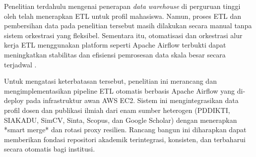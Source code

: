 \documentclass{rapidsart}
\theoremstyle{plain}
\theoremstyle{remark}
\theoremstyle{definition}
\begin{document}
\begin{sloppypar}
    Penelitian terdahulu mengenai penerapan \textit{data warehouse} di perguruan tinggi oleh \cite{oslan2018proses} telah menerapkan ETL untuk profil mahasiswa. Namun, proses ETL dan pembersihan data pada penelitian tersebut masih dilakukan secara manual tanpa sistem orkestrasi yang fleksibel. Sementara itu, otomatisasi dan orkestrasi alur kerja ETL menggunakan platform seperti Apache Airflow terbukti dapat meningkatkan stabilitas dan efisiensi pemrosesan data skala besar secara terjadwal \citep{koppula2020etl}.

    Untuk mengatasi keterbatasan tersebut, penelitian ini merancang dan mengimplementasikan pipeline ETL otomatis berbasis Apache Airflow yang di-deploy pada infrastruktur awan AWS EC2. Sistem ini mengintegrasikan data profil dosen dan publikasi ilmiah dari enam sumber heterogen (PDDIKTI, SIAKADU, SimCV, Sinta, Scopus, dan Google Scholar) dengan menerapkan *smart merge* dan rotasi proxy resilien. Rancang bangun ini diharapkan dapat memberikan fondasi repositori akademik terintegrasi, konsisten, dan terbaharui secara otomatis bagi institusi.
\end{sloppypar}
\end{document}
